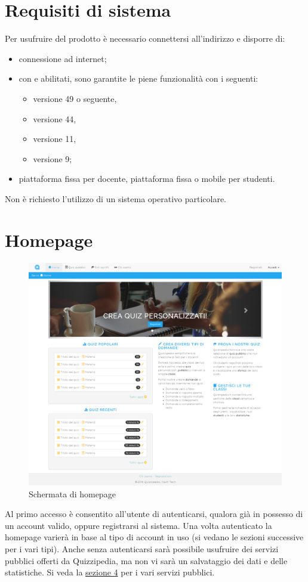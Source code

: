 \documentclass[a4paper, titlepage]{article}
\begin{document}
	\section{Requisiti di sistema}
	Per usufruire del prodotto è necessario connettersi all'indirizzo  e disporre di:
	\begin{itemize}
		\item connessione ad internet;
		\item {} con  e  abilitati, sono garantite le piene funzionalità con i seguenti:
		\begin{itemize}
			\item {} versione 49 o seguente,
			\item {} versione 44,
			\item {} versione 11,
			\item {} versione 9;
		\end{itemize}
		\item piattaforma fissa per docente, piattaforma fissa o mobile per studenti.
	\end{itemize}
	Non è richiesto l’utilizzo di un sistema operativo particolare.
	
	\newpage
	\section{Homepage}
	\begin{figure}[!h]
		\centering
		\includegraphics[scale=0.33]{Img/screen_HomepageGenerica.png}
		\caption{Schermata di homepage}
	\end{figure}
	Al primo accesso è consentito all'utente di autenticarsi, qualora già in possesso di un account valido, oppure registrarsi al sistema. Una volta autenticato la homepage varierà in base al tipo di account in uso (si vedano le sezioni successive per i vari tipi). 
	Anche senza autenticarsi sarà possibile usufruire dei servizi pubblici offerti da Quizzipedia, ma non vi sarà un salvataggio dei dati e delle statistiche. Si veda la \hyperref[pub]{sezione 4} per i vari servizi pubblici.
	
\end{document}
